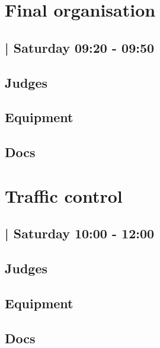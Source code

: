 \documentclass[10pt]{article}
\begin{document}
		\begin{minipage}{\linewidth}
		\setcounter{section}{14}
	\section{Final organisation }
	\subsection*{ | Saturday 09:20 - 09:50}

	

	\begin{multicols}{2}
	\subsection*{\faUsers \: Judges}
	\begin{itemize}
		\end{itemize}
	\columnbreak
	\subsection*{\faWrench \: Equipment}
	        \vfill\null
        \subsection*{\faFile \: Docs}
     	\end{multicols}


	\vspace{1cm}
	\end{minipage}

		\begin{minipage}{\linewidth}
		\setcounter{section}{15}
	\section{Traffic control }
	\subsection*{ | Saturday 10:00 - 12:00}

	

	\begin{multicols}{2}
	\subsection*{\faUsers \: Judges}
	\begin{itemize}
		\end{itemize}
	\columnbreak
	\subsection*{\faWrench \: Equipment}
	        \vfill\null
        \subsection*{\faFile \: Docs}
     	\end{multicols}


	\vspace{1cm}
	\end{minipage}
\end{document}

